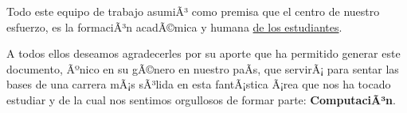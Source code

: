 Todo este equipo de trabajo asumiÃ³ como premisa que el centro de nuestro esfuerzo, 
es la formaciÃ³n acadÃ©mica y humana \underline{de los estudiantes}.

A todos ellos deseamos agradecerles por su aporte que ha permitido generar 
este documento, Ãºnico en su gÃ©nero en nuestro paÃ­s, que servirÃ¡ para sentar las 
bases de una carrera mÃ¡s sÃ³lida en esta fantÃ¡stica Ã¡rea que nos ha tocado estudiar y 
de la cual nos sentimos orgullosos de formar parte: \textbf{ComputaciÃ³n}.
